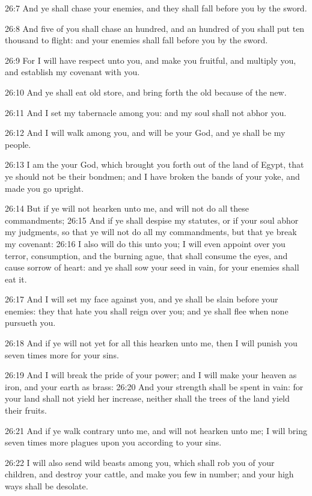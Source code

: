 26:7 And ye shall chase your enemies, and they shall fall before you by the sword.

26:8 And five of you shall chase an hundred, and an hundred of you shall put ten thousand to flight: and your enemies shall fall before you by the sword.

26:9 For I will have respect unto you, and make you fruitful, and multiply you, and establish my covenant with you.

26:10 And ye shall eat old store, and bring forth the old because of the new.

26:11 And I set my tabernacle among you: and my soul shall not abhor you.

26:12 And I will walk among you, and will be your God, and ye shall be my people.

26:13 I am the \LORD your God, which brought you forth out of the land of Egypt, that ye should not be their bondmen; and I have broken the bands of your yoke, and made you go upright.

26:14 But if ye will not hearken unto me, and will not do all these commandments; 26:15 And if ye shall despise my statutes, or if your soul abhor my judgments, so that ye will not do all my commandments, but that ye break my covenant: 26:16 I also will do this unto you; I will even appoint over you terror, consumption, and the burning ague, that shall consume the eyes, and cause sorrow of heart: and ye shall sow your seed in vain, for your enemies shall eat it.

26:17 And I will set my face against you, and ye shall be slain before your enemies: they that hate you shall reign over you; and ye shall flee when none pursueth you.

26:18 And if ye will not yet for all this hearken unto me, then I will punish you seven times more for your sins.

26:19 And I will break the pride of your power; and I will make your heaven as iron, and your earth as brass: 26:20 And your strength shall be spent in vain: for your land shall not yield her increase, neither shall the trees of the land yield their fruits.

26:21 And if ye walk contrary unto me, and will not hearken unto me; I will bring seven times more plagues upon you according to your sins.

26:22 I will also send wild beasts among you, which shall rob you of your children, and destroy your cattle, and make you few in number; and your high ways shall be desolate.

